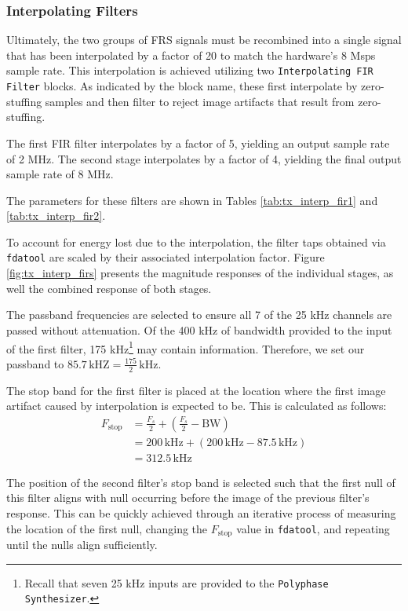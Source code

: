 \subsubsection{Interpolating Filters}

Ultimately, the two groups of \ac{FRS} signals must be recombined into a single
signal that has been interpolated by a factor of 20 to match the hardware's 8 Msps
sample rate.  This interpolation is achieved utilizing two
\texttt{Interpolating \ac{FIR} Filter} blocks. As indicated by the block name,
these first interpolate by zero-stuffing samples and then filter to reject
image artifacts that result from zero-stuffing.

The first \ac{FIR} filter interpolates by a factor of 5, yielding an output
sample rate of 2 MHz. The second stage interpolates by a factor of 4, yielding
the final output sample rate of 8 MHz.

The parameters for these filters are shown in Tables \ref{tab:tx_interp_fir1}
and \ref{tab:tx_interp_fir2}.

To account for energy lost due to the interpolation, the filter taps obtained
via \texttt{fdatool} are scaled by their associated interpolation factor. Figure
\ref{fig:tx_interp_firs} presents the magnitude responses of the individual
stages, as well the combined response of both stages.

The passband frequencies are selected to ensure all 7 of the 25 kHz channels
are passed without attenuation. Of the 400 kHz of bandwidth provided to the
input of the first filter, 175 kHz\footnote{Recall that seven 25 kHz inputs
are provided to the \texttt{Polyphase Synthesizer}.} may contain information.
Therefore, we set our passband to $85.7 \, \text{kHZ} = \frac{175}{2}
\,\text{kHz}$.

The stop band for the first filter is placed at the location where the first
image artifact caused by interpolation is expected to be. This is calculated as
follows:
\begin{align*}
  F_{\text{stop}} &= \frac{F_s}{2} + \left( \frac{F_s}{2} - \text{BW} \right) \\
  &= 200 \,\text{kHz} + \left( 200 \,\text{kHz} - 87.5 \,\text{kHz} \right) \\
  &= 312.5 \,\text{kHz}
\end{align*}

The position of the second filter's stop band is selected such that the first
null of this filter aligns with null occurring before the image of the previous
filter's response. This can be quickly achieved through an iterative process of
measuring the location of the first null, changing the $F_{\text{stop}}$ value
in \texttt{fdatool}, and repeating until the nulls align sufficiently.

